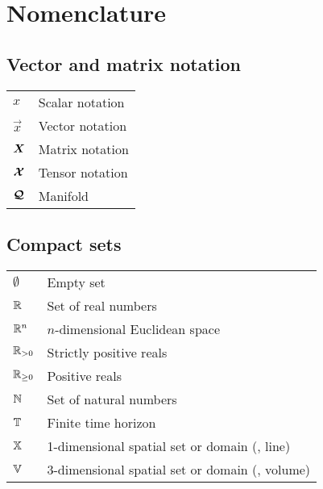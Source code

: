 \newenvironment{Nomen}
    {\vspace*{-3mm}\begin{center}
    \begin{longtable}{p{.1\textwidth} p{.93\textwidth}}
    }
    {
    \end{longtable}
    \end{center}\vspace*{-1.2cm}
    }

\newcommand{\AddSymbol}[2]{#1 & #2 \\}
\chapter*{Nomenclature}

\section*{Vector and matrix notation}
\begin{Nomen}
\AddSymbol{$x$}{Scalar notation}
\AddSymbol{$\vec{x}$}{Vector notation}
\AddSymbol{$\boldsymbol{X}$}{Matrix notation}
\AddSymbol{$\boldsymbol{\mathcal{X}}$}{Tensor notation}
\AddSymbol{$\boldsymbol{\mathcal{Q}}$}{Manifold}
\end{Nomen}


\section*{Compact sets}
\begin{Nomen}
\AddSymbol{$\emptyset$}{Empty set}
\AddSymbol{$\mathbb{R}$}{Set of real numbers}
\AddSymbol{$\mathbb{R}^n$}{$n$-dimensional Euclidean space}
\AddSymbol{$\mathbb{R}_{>0}$}{Strictly positive reals}
\AddSymbol{$\mathbb{R}_{\ge0}$}{Positive reals}
\AddSymbol{$\mathbb{N}$}{Set of natural numbers}
\AddSymbol{$\mathbb{T}$}{Finite time horizon}
\AddSymbol{$\mathbb{X}$}{1-dimensional spatial set or domain (\ie, line)}
\AddSymbol{$\mathbb{V}$}{3-dimensional spatial set or domain (\ie, volume)}
\end{Nomen}

